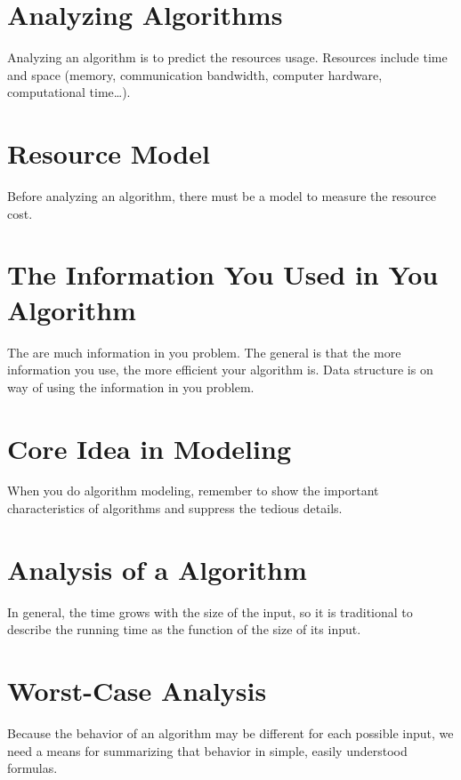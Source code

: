 \section{Analyzing Algorithms}
\label{sec:analyzing-algorithms}


Analyzing an algorithm is to predict the resources usage.
Resources include time and space (memory, communication bandwidth, computer hardware, computational time\ldots).

\section{Resource Model}

Before analyzing an algorithm, there must be a model to measure the resource cost.


\section[The Information in Algorithm]{The Information You Used in You Algorithm}

The are much information in you problem.
The general is that the more information you use, the more efficient your algorithm is.
Data structure is on way of using the information in you problem.


\section{Core Idea in Modeling}
\label{sec:core-idea-modeling}


When you do algorithm modeling, remember to show the important characteristics of algorithms and suppress the tedious details.

\section{Analysis of a Algorithm}
\label{sec:analysis-algorithm}


In general, the time grows with the size of the input, so it is traditional to describe the running time as the function of the size of its input.


\section{Worst-Case Analysis}
\label{sec:worst-case-analysis}


Because the behavior of an algorithm may be different for each possible input, we need a means for summarizing that behavior in simple, easily understood formulas.



